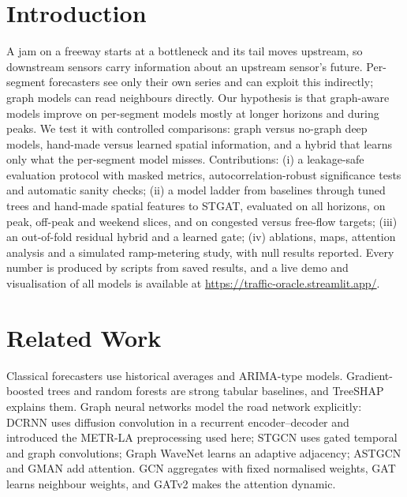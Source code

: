 \documentclass[conference]{IEEEtran}
\begin{document}
\section{Introduction}
A jam on a freeway starts at a bottleneck and its tail moves upstream, so downstream sensors carry information about an upstream sensor's future.
Per-segment forecasters see only their own series and can exploit this indirectly; graph models can read neighbours directly.
Our hypothesis is that graph-aware models improve on per-segment models mostly at longer horizons and during peaks.
We test it with controlled comparisons: graph versus no-graph deep models, hand-made versus learned spatial information, and a hybrid that learns only what the per-segment model misses.
Contributions: (i) a leakage-safe evaluation protocol with masked metrics, autocorrelation-robust significance tests and automatic sanity checks; (ii) a model ladder from baselines through tuned trees and hand-made spatial features to STGAT, evaluated on all horizons, on peak, off-peak and weekend slices, and on congested versus free-flow targets; (iii) an out-of-fold residual hybrid and a learned gate; (iv) ablations, maps, attention analysis and a simulated ramp-metering study, with null results reported.
Every number is produced by scripts from saved results, and a live demo and visualisation of all models is available at \url{https://traffic-oracle.streamlit.app/}.

\section{Related Work}
Classical forecasters use historical averages and ARIMA-type models.
Gradient-boosted trees \cite{chen2016xgboost} and random forests \cite{breiman2001rf} are strong tabular baselines, and TreeSHAP \cite{lundberg2017shap} explains them.
Graph neural networks model the road network explicitly: DCRNN \cite{li2018dcrnn} uses diffusion convolution in a recurrent encoder--decoder and introduced the METR-LA preprocessing used here; STGCN \cite{yu2018stgcn} uses gated temporal and graph convolutions; Graph WaveNet \cite{wu2019graphwavenet} learns an adaptive adjacency; ASTGCN \cite{guo2019astgcn} and GMAN \cite{zheng2020gman} add attention.
GCN \cite{kipf2017gcn} aggregates with fixed normalised weights, GAT \cite{velickovic2018gat} learns neighbour weights, and GATv2 \cite{brody2022gatv2} makes the attention dynamic.
\end{document}
